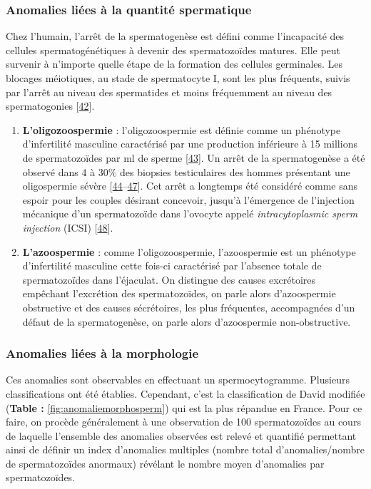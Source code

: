 \documentclass[12pt,a4paper,twoside]{ugathesis}
\theoremstyle{definition}
\theoremstyle{definition}
\theoremstyle{definition}
\theoremstyle{remark}
\begin{document}
\newpage

\subsubsection{Anomalies liées à la quantité
spermatique}\label{infquant}

Chez l'humain, l'arrêt de la spermatogenèse est défini comme
l'incapacité des cellules spermatogénétiques à devenir des
spermatozoïdes matures. Elle peut survenir à n'importe quelle étape de
la formation des cellules germinales. Les blocages méiotiques, au stade
de spermatocyte I, sont les plus fréquents, suivis par l'arrêt au niveau
des spermatides et moins fréquemment au niveau des spermatogonies
{[}\protect\hyperlink{ref-Girgis}{42}{]}.

\begin{enumerate}
\def\labelenumi{\arabic{enumi}.}
\item
  \textbf{L'oligozoospermie} : l'oligozoospermie est définie comme un
  phénotype d'infertilité masculine caractérisé par une production
  inférieure à 15 millions de spermatozoïdes par ml de sperme
  {[}\protect\hyperlink{ref-Cooper2010}{43}{]}. Un arrêt de la
  spermatogenèse a été observé dans 4 à 30\% des biopsies testiculaires
  des hommes présentant une oligospermie sévère
  {[}\protect\hyperlink{ref-Colgan1980}{44}--\protect\hyperlink{ref-WONG1973}{47}{]}.
  Cet arrêt a longtemps été considéré comme sans espoir pour les couples
  désirant concevoir, jusqu'à l'émergence de l'injection mécanique d'un
  spermatozoïde dans l'ovocyte appelé \emph{intracytoplasmic sperm
  injection} (ICSI) {[}\protect\hyperlink{ref-Palermo1992}{48}{]}.
\item
  \textbf{L'azoospermie} : comme l'oligozoospermie, l'azoospermie est un
  phénotype d'infertilité masculine cette fois-ci caractérisé par
  l'absence totale de spermatozoïdes dans l'éjaculat. On distingue des
  causes excrétoires empêchant l'excrétion des spermatozoïdes, on parle
  alors d'azoospermie obstructive et des causes sécrétoires, les plus
  fréquentes, accompagnées d'un défaut de la spermatogenèse, on parle
  alors d'azoospermie non-obstructive.
\end{enumerate}

\subsubsection{Anomalies liées à la
morphologie}\label{anomalies-liees-a-la-morphologie}

Ces anomalies sont observables en effectuant un spermocytogramme.
Plusieurs classifications ont été établies. Cependant, c'est la
classification de David modifiée (\textbf{Table :}
\ref{fig:anomaliemorphosperm}) qui est la plus répandue en France. Pour
ce faire, on procède généralement à une observation de 100
spermatozoïdes au cours de laquelle l'ensemble des anomalies observées
est relevé et quantifié permettant ainsi de définir un index d'anomalies
multiples (nombre total d'anomalies/nombre de spermatozoïdes anormaux)
révélant le nombre moyen d'anomalies par spermatozoïdes.
\end{document}
